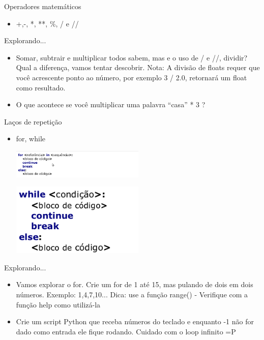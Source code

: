 \documentclass{beamer}
\begin{document}
\begin{frame}{Operadores matem\'aticos}
 \begin{itemize}
  \item +,-, *, **, \%, / e //
 \end{itemize}

\end{frame}

\begin{frame}{Explorando...}
 \begin{itemize}
  \item Somar, subtrair e multiplicar todos sabem, mas e o uso de / e //, dividir? Qual a diferen\c{c}a, vamos tentar descobrir. Nota: A divis\~ao de floats requer que voc\^e acrescente ponto ao n\'umero, por exemplo 3 / 2.0, retornar\'a um float como resultado.
  \item O que acontece se voc\^e multiplicar uma palavra ``casa'' * 3 ?
 \end{itemize}

\end{frame}

\begin{frame}{La\c{c}os de repeti\c{c}\~ao}
 \begin{itemize}
  \item for, while
  
  \begin{center}
   \includegraphics[width=0.5\textwidth]{images/for.png}
\end{center}
\begin{center}
   \includegraphics[width=0.5\textwidth]{images/while.png}
\end{center}
 \end{itemize}

\end{frame}

\begin{frame}{Explorando...}
 \begin{itemize}
  \item Vamos explorar o for. Crie um for de 1 at\'e 15, mas pulando de dois em dois n\'umeros. Exemplo: 1,4,7,10... Dica: use a fun\c{c}\~ao range() - Verifique com a fun\c{c}\~ao help como utiliz\'a\--la
  \item  Crie um script Python que receba n\'umeros do teclado e enquanto -1 n\~ao for dado como entrada ele fique rodando. Cuidado com o  loop infinito =P
 \end{itemize}

\end{frame}
\end{document}
